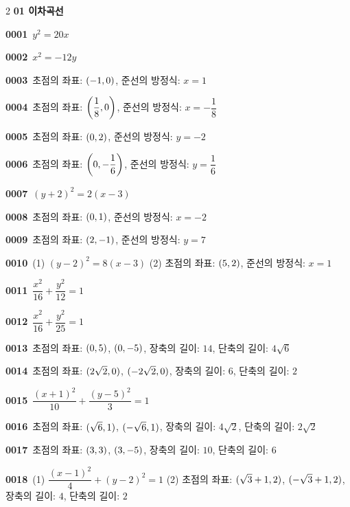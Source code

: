 \documentclass[10pt,a4paper]{article}
\begin{document}
\begin{multicols}{2}\small
\noindent\textbf{01 이차곡선}\par\smallskip
\noindent\textbf{0001}\ $y^2=20x$\par
\noindent\textbf{0002}\ $x^2=-12y$\par
\noindent\textbf{0003}\ 초점의 좌표: $(-1{,}\mkern3mu\mathopen{}0)$, 준선의 방정식: $x=1$\par
\noindent\textbf{0004}\ 초점의 좌표: $\left(\dfrac{1}{8}{,}\mkern3mu\mathopen{}0\right)$, 준선의 방정식: $x=-\dfrac{1}{8}$\par
\noindent\textbf{0005}\ 초점의 좌표: $(0{,}\mkern3mu\mathopen{}2)$, 준선의 방정식: $y=-2$\par
\noindent\textbf{0006}\ 초점의 좌표: $\left(0{,}\mkern3mu\mathopen{}-\dfrac{1}{6}\right)$, 준선의 방정식: $y=\dfrac{1}{6}$\par
\noindent\textbf{0007}\ $(y+2)^2=2(x-3)$\par
\noindent\textbf{0008}\ 초점의 좌표: $(0{,}\mkern3mu\mathopen{}1)$, 준선의 방정식: $x=-2$\par
\noindent\textbf{0009}\ 초점의 좌표: $(2{,}\mkern3mu\mathopen{}-1)$, 준선의 방정식: $y=7$\par
\noindent\textbf{0010}\ (1) $(y-2)^2=8(x-3)$ \quad (2) 초점의 좌표: $(5{,}\mkern3mu\mathopen{}2)$, 준선의 방정식: $x=1$\par
\noindent\textbf{0011}\ $\dfrac{x^2}{16}+\dfrac{y^2}{12}=1$\par
\noindent\textbf{0012}\ $\dfrac{x^2}{16}+\dfrac{y^2}{25}=1$\par
\noindent\textbf{0013}\ 초점의 좌표: $(0{,}\mkern3mu\mathopen{}5)$, $(0{,}\mkern3mu\mathopen{}-5)$, 장축의 길이: $14$, 단축의 길이: $4\sqrt{6}$\par
\noindent\textbf{0014}\ 초점의 좌표: $(2\sqrt{2}{,}\mkern3mu\mathopen{}0)$, $(-2\sqrt{2}{,}\mkern3mu\mathopen{}0)$, 장축의 길이: $6$, 단축의 길이: $2$\par
\noindent\textbf{0015}\ $\dfrac{(x+1)^2}{10}+\dfrac{(y-5)^2}{3}=1$\par
\noindent\textbf{0016}\ 초점의 좌표: $(\sqrt{6}{,}\mkern3mu\mathopen{}1)$, $(-\sqrt{6}{,}\mkern3mu\mathopen{}1)$, 장축의 길이: $4\sqrt{2}$, 단축의 길이: $2\sqrt{2}$\par
\noindent\textbf{0017}\ 초점의 좌표: $(3{,}\mkern3mu\mathopen{}3)$, $(3{,}\mkern3mu\mathopen{}-5)$, 장축의 길이: $10$, 단축의 길이: $6$\par
\noindent\textbf{0018}\ (1) $\dfrac{(x-1)^2}{4}+(y-2)^2=1$ \quad (2) 초점의 좌표: $(\sqrt{3}+1{,}\mkern3mu\mathopen{}2)$, $(-\sqrt{3}+1{,}\mkern3mu\mathopen{}2)$, 장축의 길이: $4$, 단축의 길이: $2$\par

\end{multicols}
\end{document}
